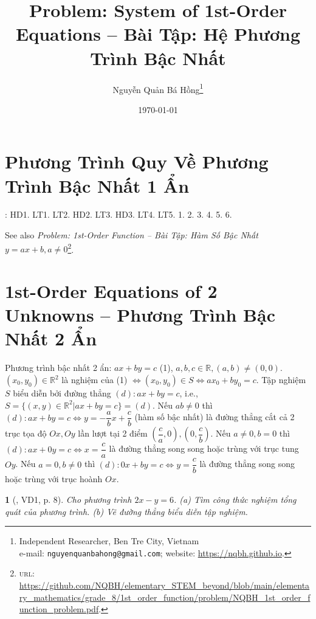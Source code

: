 \documentclass{article}
\title{Problem: System of 1st-Order Equations -- Bài Tập: Hệ Phương Trình Bậc Nhất}
\author{Nguyễn Quản Bá Hồng\footnote{Independent Researcher, Ben Tre City, Vietnam\\e-mail: \texttt{nguyenquanbahong@gmail.com}; website: \url{https://nqbh.github.io}.}}
\date{\today}
\newtheorem{baitoan}{}
\begin{document}
\maketitle
\tableofcontents


\section{Phương Trình Quy Về Phương Trình Bậc Nhất 1 Ẩn}
\cite[\S1, pp. 5--11]{SGK_Toan_9_Canh_Dieu_tap_1}: HD1. LT1. LT2. HD2. LT3. HD3. LT4. LT5. 1. 2. 3. 4. 5. 6.

See also \textit{Problem: 1st-Order Function -- Bài Tập: Hàm Số Bậc Nhất $y = ax + b,a\ne0$}\footnote{\textsc{url}: \url{https://github.com/NQBH/elementary_STEM_beyond/blob/main/elementary_mathematics/grade_8/1st_order_function/problem/NQBH_1st_order_function_problem.pdf}.}.


\section{1st-Order Equations of 2 Unknowns -- Phương Trình Bậc Nhất 2 Ẩn}
 Phương trình bậc nhất 2 ẩn: $ax + by = c$ (1), $a,b,c\in\mathbb{R},(a,b)\ne(0,0)$.  $(x_0,y_0)\in\mathbb{R}^2$ là nghiệm của (1) $\Leftrightarrow(x_0,y_0)\in S\Leftrightarrow ax_0 + by_0 = c$.  Tập nghiệm $S$ biểu diễn bởi đường thẳng $(d):ax + by = c$, i.e., $S = \{(x,y)\in\mathbb{R}^2|ax + by = c\} = (d)$.  Nếu $ab\ne0$ thì $(d):ax + by = c\Leftrightarrow y = -\dfrac{a}{b}x + \dfrac{c}{b}$ (hàm số bậc nhất) là đường thẳng cắt cả 2 trục tọa độ $Ox,Oy$ lần lượt tại 2 điểm $\left(\dfrac{c}{a},0\right),\left(0,\dfrac{c}{b}\right)$.  Nếu $a\ne0,b = 0$ thì $(d):ax + 0y = c\Leftrightarrow x = \dfrac{c}{a}$ là đường thẳng song song hoặc trùng với trục tung $Oy$.  Nếu $a = 0,b\ne0$ thì $(d):0x + by = c\Leftrightarrow y = \dfrac{c}{b}$ là đường thẳng song song hoặc trùng với trục hoành $Ox$.

\begin{baitoan}[\cite{Binh_boi_duong_Toan_9_tap_2}, VD1, p. 8]
	Cho phương trình $2x - y = 6$. (a) Tìm công thức nghiệm tổng quát của phương trình. (b) Vẽ đường thẳng biểu diễn tập nghiệm.
\end{baitoan}
\end{document}
